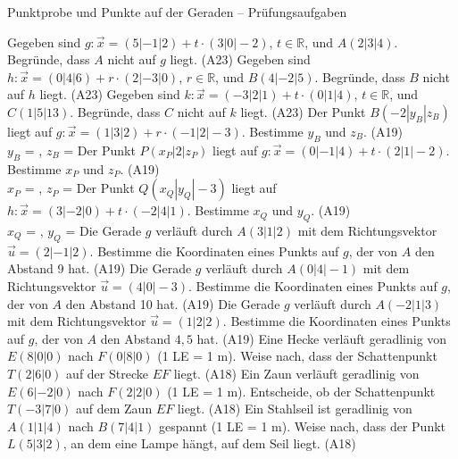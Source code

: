 \begin{aufgabe}{Punktprobe und Punkte auf der Geraden – Prüfungsaufgaben}
\begin{teile}
\teil Gegeben sind $g\colon \vec x = (5 | -1 | 2) + t \cdot (3 | 0 | -2)$, $t \in \mathbb{R}$, und $A(2 | 3 | 4)$. Begründe, dass $A$ nicht auf $g$ liegt. \hfill (A23)
\teil Gegeben sind $h\colon \vec x = (0 | 4 | 6) + r \cdot (2 | -3 | 0)$, $r \in \mathbb{R}$, und $B(4 | -2 | 5)$. Begründe, dass $B$ nicht auf $h$ liegt. \hfill (A23)
\teil Gegeben sind $k\colon \vec x = (-3 | 2 | 1) + t \cdot (0 | 1 | 4)$, $t \in \mathbb{R}$, und $C(1 | 5 | 13)$. Begründe, dass $C$ nicht auf $k$ liegt. \hfill (A23)
\teil Der Punkt $B(-2 | y_B | z_B)$ liegt auf $g\colon \vec x = (1 | 3 | 2) + r \cdot (-1 | 2 | -3)$. Bestimme $y_B$ und $z_B$. \hfill (A19) \\ $y_B$ = \leerfeld , $z_B$ = \leerfeld
\teil Der Punkt $P(x_P | 2 | z_P)$ liegt auf $g\colon \vec x = (0 | -1 | 4) + t \cdot (2 | 1 | -2)$. Bestimme $x_P$ und $z_P$. \hfill (A19) \\ $x_P$ = \leerfeld , $z_P$ = \leerfeld
\teil Der Punkt $Q(x_Q | y_Q | -3)$ liegt auf $h\colon \vec x = (3 | -2 | 0) + t \cdot (-2 | 4 | 1)$. Bestimme $x_Q$ und $y_Q$. \hfill (A19) \\ $x_Q$ = \leerfeld , $y_Q$ = \leerfeld
\teil Die Gerade $g$ verläuft durch $A(3 | 1 | 2)$ mit dem Richtungsvektor $\vec u = (2 | -1 | 2)$. Bestimme die Koordinaten eines Punkts auf $g$, der von $A$ den Abstand 9 hat. \hfill (A19)
\teil Die Gerade $g$ verläuft durch $A(0 | 4 | -1)$ mit dem Richtungsvektor $\vec u = (4 | 0 | -3)$. Bestimme die Koordinaten eines Punkts auf $g$, der von $A$ den Abstand 10 hat. \hfill (A19)
\teil Die Gerade $g$ verläuft durch $A(-2 | 1 | 3)$ mit dem Richtungsvektor $\vec u = (1 | 2 | 2)$. Bestimme die Koordinaten eines Punkts auf $g$, der von $A$ den Abstand $4{,}5$ hat. \hfill (A19)
\teil Eine Hecke verläuft geradlinig von $E(8 | 0 | 0)$ nach $F(0 | 8 | 0)$ (1 LE = 1 m). Weise nach, dass der Schattenpunkt $T(2 | 6 | 0)$ auf der Strecke $EF$ liegt. \hfill (A18)
\teil Ein Zaun verläuft geradlinig von $E(6 | -2 | 0)$ nach $F(2 | 2 | 0)$ (1 LE = 1 m). Entscheide, ob der Schattenpunkt $T(-3 | 7 | 0)$ auf dem Zaun $EF$ liegt. \hfill (A18)
\teil Ein Stahlseil ist geradlinig von $A(1 | 1 | 4)$ nach $B(7 | 4 | 1)$ gespannt (1 LE = 1 m). Weise nach, dass der Punkt $L(5 | 3 | 2)$, an dem eine Lampe hängt, auf dem Seil liegt. \hfill (A18)
\end{teile}
\end{aufgabe}


